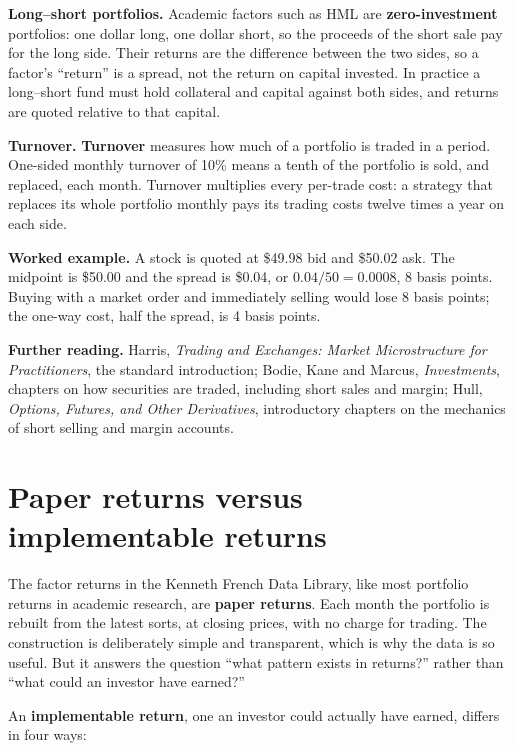 \textbf{Long--short portfolios.} Academic factors such as HML are \textbf{zero-investment} portfolios: one dollar long, one dollar short, so the proceeds of the short sale pay for the long side. Their returns are the difference between the two sides, so a factor's ``return'' is a spread, not the return on capital invested. In practice a long--short fund must hold collateral and capital against both sides, and returns are quoted relative to that capital.

\textbf{Turnover.} \textbf{Turnover} measures how much of a portfolio is traded in a period. One-sided monthly turnover of 10\% means a tenth of the portfolio is sold, and replaced, each month. Turnover multiplies every per-trade cost: a strategy that replaces its whole portfolio monthly pays its trading costs twelve times a year on each side.

\textbf{Worked example.} A stock is quoted at \$49.98 bid and \$50.02 ask. The midpoint is \$50.00 and the spread is \$0.04, or $0.04/50 = 0.0008$, 8 basis points. Buying with a market order and immediately selling would lose 8 basis points; the one-way cost, half the spread, is 4 basis points.

\textbf{Further reading.} Harris, \emph{Trading and Exchanges: Market Microstructure for Practitioners}, the standard introduction; Bodie, Kane and Marcus, \emph{Investments}, chapters on how securities are traded, including short sales and margin; Hull, \emph{Options, Futures, and Other Derivatives}, introductory chapters on the mechanics of short selling and margin accounts.

\section{Paper returns versus implementable returns}
\label{sec:06-paper}

The factor returns in the Kenneth French Data Library, like most portfolio returns in academic research, are \textbf{paper returns}. Each month the portfolio is rebuilt from the latest sorts, at closing prices, with no charge for trading. The construction is deliberately simple and transparent, which is why the data is so useful. But it answers the question ``what pattern exists in returns?'' rather than ``what could an investor have earned?''

An \textbf{implementable return}, one an investor could actually have earned, differs in four ways:

